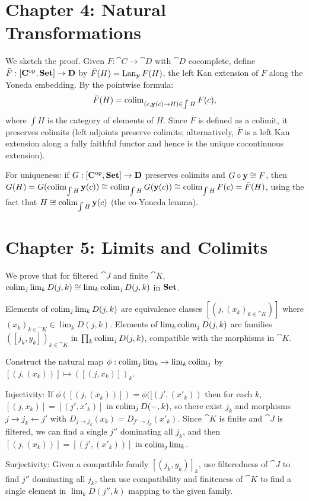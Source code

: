 \section*{Chapter 4: Natural Transformations}

\begin{exercise}
We sketch the proof. Given $F: \cat{C} \to \cat{D}$ with $\cat{D}$ cocomplete, define $\bar{F}: [\mathbf{C}^{\mathrm{op}},\mathbf{Set}] \to \mathbf{D}$ by $\bar{F}(H) = \operatorname{Lan}_{\mathbf{y}} F(H)$, the left Kan extension of $F$ along the Yoneda embedding. By the pointwise formula:
\[
  \bar{F}(H) = \operatorname{colim}_{(c, \mathbf{y}(c) \to H) \in \int H} F(c),
\]
where $\int H$ is the category of elements of $H$. Since $\bar{F}$ is defined as a colimit, it preserves colimits (left adjoints preserve colimits; alternatively, $\bar{F}$ is a left Kan extension along a fully faithful functor and hence is the unique cocontinuous extension).

For uniqueness: if $G: [\mathbf{C}^{\mathrm{op}},\mathbf{Set}] \to \mathbf{D}$ preserves colimits and $G \circ \mathbf{y} \cong F$, then $G(H) = G(\operatorname{colim}_{\int H} \mathbf{y}(c)) \cong \operatorname{colim}_{\int H} G(\mathbf{y}(c)) \cong \operatorname{colim}_{\int H} F(c) = \bar{F}(H)$, using the fact that $H \cong \operatorname{colim}_{\int H} \mathbf{y}(c)$ (the co-Yoneda lemma).
\end{exercise}

\section*{Chapter 5: Limits and Colimits}

\begin{exercise}
We prove that for filtered $\cat{J}$ and finite $\cat{K}$, $\operatorname{colim}_j \lim_k D(j,k) \cong \lim_k \operatorname{colim}_j D(j,k)$ in $\mathbf{Set}$.

Elements of $\operatorname{colim}_j \lim_k D(j,k)$ are equivalence classes $[(j, (x_k)_{k \in \cat{K}})]$ where $(x_k)_{k \in \cat{K}} \in \lim_k D(j,k)$. Elements of $\lim_k \operatorname{colim}_j D(j,k)$ are families $([j_k, y_k])_{k \in \cat{K}}$ in $\prod_k \operatorname{colim}_j D(j,k)$, compatible with the morphisms in $\cat{K}$.

Construct the natural map $\phi: \operatorname{colim}_j \lim_k \to \lim_k \operatorname{colim}_j$ by $[(j, (x_k))] \mapsto ([(j, x_k)])_k$.

Injectivity: If $\phi([(j, (x_k))]) = \phi([(j', (x'_k))$ then for each $k$, $[(j, x_k)] = [(j', x'_k)]$ in $\operatorname{colim}_j D(-,k)$, so there exist $j_k$ and morphisms $j \to j_k \leftarrow j'$ with $D_{j \to j_k}(x_k) = D_{j' \to j_k}(x'_k)$. Since $\cat{K}$ is finite and $\cat{J}$ is filtered, we can find a single $j''$ dominating all $j_k$, and then $[(j,(x_k))] = [(j', (x'_k))]$ in $\operatorname{colim}_j \lim_k$.

Surjectivity: Given a compatible family $[(j_k, y_k)]_k$, use filteredness of $\cat{J}$ to find $j''$ dominating all $j_k$, then use compatibility and finiteness of $\cat{K}$ to find a single element in $\lim_k D(j'',k)$ mapping to the given family.
\end{exercise}

